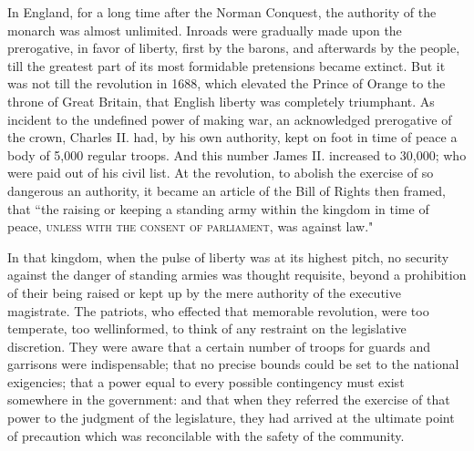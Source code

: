 In England, for a long time after the Norman Conquest, the authority of the monarch was almost unlimited. 
Inroads were gradually made upon the prerogative, in favor of liberty, first by the barons, and afterwards by the people, till the greatest part of its most formidable pretensions became extinct. 
But it was not till the revolution in 1688, which elevated the Prince of Orange to the throne of Great Britain, that English liberty was completely triumphant. 
As incident to the undefined power of making war, an acknowledged prerogative of the crown, Charles II. 
had, by his own authority, kept on foot in time of peace a body of 5,000 regular troops. 
And this number James II. 
increased to 30,000; who were paid out of his civil list. 
At the revolution, to abolish the exercise of so dangerous an authority, it became an article of the Bill of Rights then framed, that ``the raising or keeping a standing army within the kingdom in time of peace, \textsc{unless with the consent of parliament}, was against law."

In that kingdom, when the pulse of liberty was at its highest pitch, no security against the danger of standing armies was thought requisite, beyond a prohibition of their being raised or kept up by the mere authority of the executive magistrate. 
The patriots, who effected that memorable revolution, were too temperate, too wellinformed, to think of any restraint on the legislative discretion. 
They were aware that a certain number of troops for guards and garrisons were indispensable; that no precise bounds could be set to the national exigencies; that a power equal to every possible contingency must exist somewhere in the government: and that when they referred the exercise of that power to the judgment of the legislature, they had arrived at the ultimate point of precaution which was reconcilable with the safety of the community.

